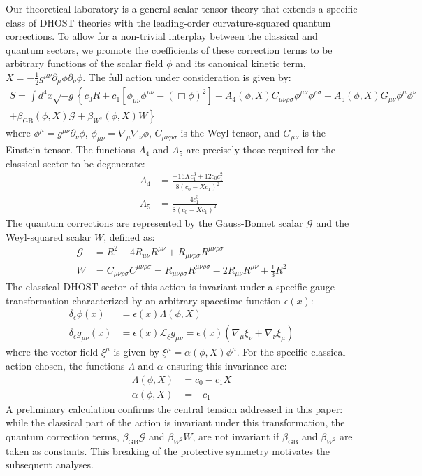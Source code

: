 \documentclass[twocolumn]{aastex631}
\begin{document}
Our theoretical laboratory is a general scalar-tensor theory that extends a specific class of DHOST theories with the leading-order curvature-squared quantum corrections. To allow for a non-trivial interplay between the classical and quantum sectors, we promote the coefficients of these correction terms to be arbitrary functions of the scalar field $\phi$ and its canonical kinetic term, $X = -\frac{1}{2} g^{\mu\nu}\partial_\mu\phi\partial_\nu\phi$. The full action under consideration is given by:
\begin{multline}
S = \int d^4x \sqrt{-g} \left\{ c_0 R + c_1 \left[\phi_{\mu\nu}\phi^{\mu\nu} - (\Box\phi)^2\right] + A_4(\phi, X) C_{\mu\nu\rho\sigma} \phi^{\mu\nu}\phi^{\rho\sigma} + A_5(\phi, X) G_{\mu\nu}\phi^\mu\phi^\nu \right. \\
\left. + \beta_{\text{GB}}(\phi, X) \mathcal{G} + \beta_{W^2}(\phi, X) W \right\}
\end{multline}
where $\phi^\mu = g^{\mu\nu}\partial_\nu\phi$, $\phi_{\mu\nu} = \nabla_\mu\nabla_\nu\phi$, $C_{\mu\nu\rho\sigma}$ is the Weyl tensor, and $G_{\mu\nu}$ is the Einstein tensor. The functions $A_4$ and $A_5$ are precisely those required for the classical sector to be degenerate:
\begin{align}
A_4 &= \frac{-16Xc_1^3 + 12c_0c_1^2}{8(c_0 - Xc_1)^2} \\
A_5 &= \frac{4c_1^3}{8(c_0 - Xc_1)^2}
\end{align}
The quantum corrections are represented by the Gauss-Bonnet scalar $\mathcal{G}$ and the Weyl-squared scalar $W$, defined as:
\begin{align}
\mathcal{G} &= R^2 - 4R_{\mu\nu}R^{\mu\nu} + R_{\mu\nu\rho\sigma}R^{\mu\nu\rho\sigma} \\
W &= C_{\mu\nu\rho\sigma}C^{\mu\nu\rho\sigma} = R_{\mu\nu\rho\sigma}R^{\mu\nu\rho\sigma} - 2R_{\mu\nu}R^{\mu\nu} + \frac{1}{3}R^2
\end{align}
The classical DHOST sector of this action is invariant under a specific gauge transformation characterized by an arbitrary spacetime function $\epsilon(x)$:
\begin{align}
\delta_\epsilon \phi(x) &= \epsilon(x) \Lambda(\phi, X) \\
\delta_\epsilon g_{\mu\nu}(x) &= \epsilon(x) \mathcal{L}_{\xi} g_{\mu\nu} = \epsilon(x) (\nabla_\mu \xi_\nu + \nabla_\nu \xi_\mu)
\end{align}
where the vector field $\xi^\mu$ is given by $\xi^\mu = \alpha(\phi, X) \phi^\mu$. For the specific classical action chosen, the functions $\Lambda$ and $\alpha$ ensuring this invariance are:
\begin{align}
\Lambda(\phi, X) &= c_0 - c_1 X \\
\alpha(\phi, X) &= -c_1
\end{align}
A preliminary calculation confirms the central tension addressed in this paper: while the classical part of the action is invariant under this transformation, the quantum correction terms, $\beta_{\text{GB}}\mathcal{G}$ and $\beta_{W^2}W$, are not invariant if $\beta_{\text{GB}}$ and $\beta_{W^2}$ are taken as constants. This breaking of the protective symmetry motivates the subsequent analyses.
\end{document}
